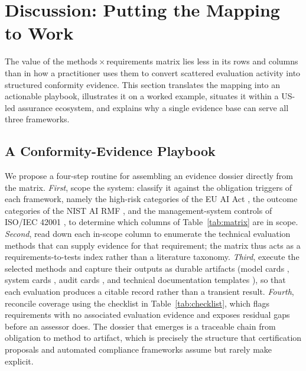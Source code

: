 \section{Discussion: Putting the Mapping to Work}
\label{sec:discussion}

The value of the methods\,$\times$\,requirements matrix lies less in its rows and columns than in how a practitioner uses them to convert scattered evaluation activity into structured conformity evidence. This section translates the mapping into an actionable playbook, illustrates it on a worked example, situates it within a US-led assurance ecosystem, and explains why a single evidence base can serve all three frameworks.

\subsection{A Conformity-Evidence Playbook}
We propose a four-step routine for assembling an evidence dossier directly from the matrix. \textit{First}, scope the system: classify it against the obligation triggers of each framework, namely the high-risk categories of the EU AI Act \cite{euaiact2024}, the outcome categories of the NIST AI RMF \cite{nist2023airmf}, and the management-system controls of ISO/IEC 42001 \cite{iso42001}, to determine which columns of Table~\ref{tab:matrix} are in scope. \textit{Second}, read down each in-scope column to enumerate the technical evaluation methods that can supply evidence for that requirement; the matrix thus acts as a requirements-to-tests index rather than a literature taxonomy. \textit{Third}, execute the selected methods and capture their outputs as durable artifacts (model cards \cite{puhlfurss2025modelcards}, system cards \cite{reddy2025systemcards}, audit cards \cite{staufer2025auditcards}, and technical documentation templates \cite{lucaj2025techops}), so that each evaluation produces a citable record rather than a transient result. \textit{Fourth}, reconcile coverage using the checklist in Table~\ref{tab:checklist}, which flags requirements with no associated evaluation evidence and exposes residual gaps before an assessor does. The dossier that emerges is a traceable chain from obligation to method to artifact, which is precisely the structure that certification proposals \cite{pan2024modelreporting} and automated compliance frameworks \cite{compliance2025pasta} assume but rarely make explicit.

